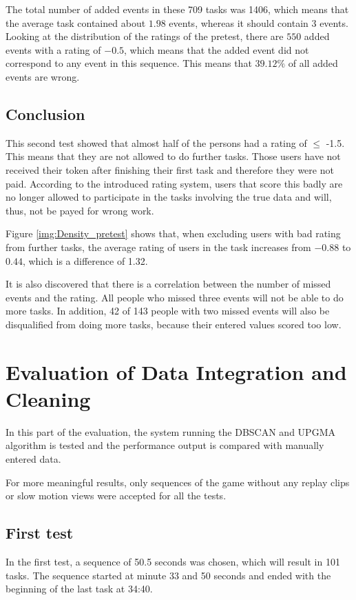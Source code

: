 The total number of added events in these 709 tasks was 1406, which means that the average task contained about $1.98$ events, whereas it should contain 3 events.
Looking at the distribution of the ratings of the pretest, there are $550$ added events with a rating of $-0.5$, which means that the added event did not correspond to any event in this sequence. This means that $39.12\%$ of all added events are wrong.

\subsection{Conclusion}

This second test showed that almost half of the persons had a rating of $\le$ -1.5. This means that they are not allowed to do further tasks. Those users have not received their token after finishing their first task and therefore they were not paid.
According to the introduced rating system, users that score this badly are no longer allowed to participate in the tasks involving the true data and will, thus, not be payed for wrong work.

Figure \ref{img:Density_pretest} shows that, when excluding users with bad rating from further tasks, the average rating of users in the task increases from $-0.88$ to $0.44$, which is a difference of 1.32.

It is also discovered that there is a correlation between the number of missed events and the rating. All people who missed three events will not be able to do more tasks. In addition, 42 of 143 people with two missed events will also be disqualified from doing more tasks, because their entered values scored too low.


\newpage

\section{Evaluation of Data Integration and Cleaning}

In this part of the evaluation, the system running the DBSCAN and UPGMA algorithm is tested and the performance output is compared with manually entered data.

For more meaningful results, only sequences of the game without any replay clips or slow motion views were accepted for all the tests.


\subsection{First test}
In the first test, a sequence of 50.5 seconds was chosen, which will result in 101 tasks.
The sequence started at minute 33 and 50 seconds and ended with the beginning of the last task at 34:40.

